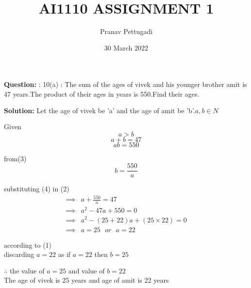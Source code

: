 \documentclass[journal,12pt,twocolumn]{IEEEtran}
\begin{document}
\newcommand{\question}{\noindent \textbf{Question: }}	
\newcommand{\solution}{\noindent \textbf{Solution: }}
\title{AI1110 ASSIGNMENT 1}
\author{Pranav Pettugadi}
\date{30 March 2022}
\maketitle

\question : 10(a) :
  The sum of the ages of vivek and his younger brother amit is 47 years.The product of their ages in years is 550.Find their ages.
  
  \solution
  Let the age of vivek be 'a' and the age of amit be 'b'.$ a,b \in N$
  
  Given
  \begin{equation}
\label{maineq}
a>b
  \end{equation}
 \begin{equation}
\label{eq1}
     a+b=47
 \end{equation}
\begin{equation}
 \label{eq2}
 ab=550
\end{equation}
 
  from(3)
 \begin{equation}
b=\frac{550}{a}     
 \end{equation}
 
 substituting (4) in (2)
 \begin{align*}
    \implies & a+\frac{550}{a}=47\\
    \implies & a^2-47a+550=0\\
    \implies & a^2-(25+22)a+(25\times22)=0\\
    \implies & a=25 \hspace{8pt}or\hspace{8pt} a=22
\end{align*}
\begin{center}
     according to (1)\\
   discarding $a=22$ as if $a=22 $ then $b=25$ \\
\end{center}

 $ \therefore $ the value of $a=25$ and value of $b=22$ \\
The age of vivek is 25 years and age of amit is 22 years

 
\end{document}
